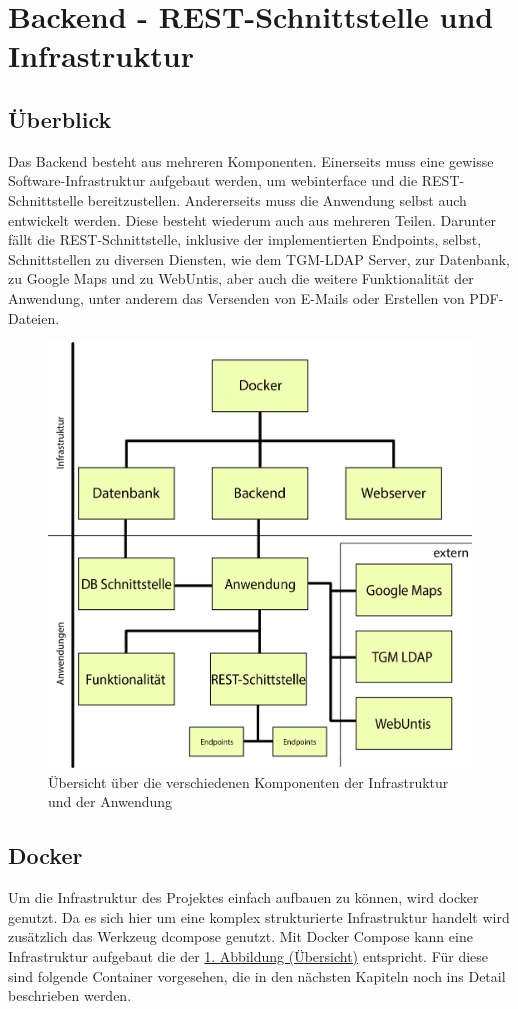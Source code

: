 \section{Backend - REST-Schnittstelle und Infrastruktur}
	\subsection{Überblick}
	Das Backend besteht aus mehreren Komponenten. Einerseits muss eine gewisse Software-Infrastruktur aufgebaut werden, um \Gls{webinterface} und die REST-Schnittstelle bereitzustellen. Andererseits muss die Anwendung selbst auch entwickelt werden. Diese besteht wiederum auch aus mehreren Teilen. Darunter fällt die REST-Schnittstelle, inklusive der implementierten Endpoints, selbst, Schnittstellen zu diversen Diensten, wie dem TGM-LDAP Server, zur Datenbank, zu Google Maps und zu WebUntis, aber auch die weitere Funktionalität der Anwendung, unter anderem das Versenden von E-Mails oder Erstellen von PDF-Dateien.
	\\
	\begin{figure}[H]
		\centering
		\includegraphics[width=0.8\linewidth]{images/uebersicht}
		\caption[Übersicht über die Komponenten]{Übersicht über die verschiedenen Komponenten der Infrastruktur und der Anwendung}
		\label{fig:uebersicht}
	\end{figure}
	
	\subsection{Docker}
	Um die Infrastruktur des Projektes einfach aufbauen zu können, wird \Gls{docker} genutzt. Da es sich hier um eine komplex strukturierte Infrastruktur handelt wird zusätzlich das Werkzeug \Gls{dcompose} genutzt. Mit Docker Compose kann eine Infrastruktur aufgebaut die der \hyperref[fig:uebersicht]{1. Abbildung (Übersicht)} entspricht. Für diese sind folgende Container vorgesehen, die in den nächsten Kapiteln noch ins Detail beschrieben werden.
